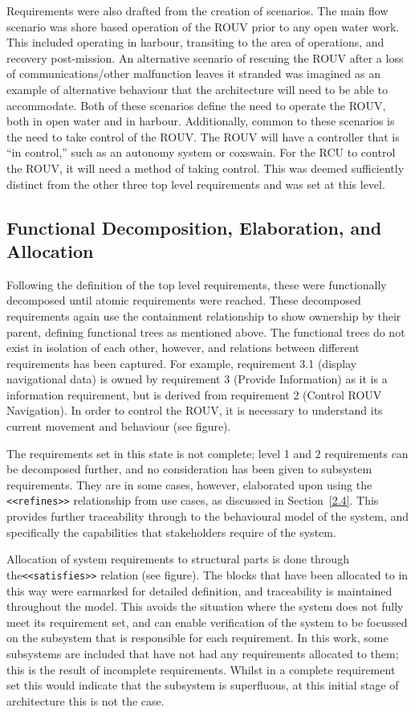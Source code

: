 \documentclass[../main.tex]{subfiles}
\begin{document}
Requirements were also drafted from the creation of scenarios.
The main flow scenario was shore based operation of the ROUV prior to any open water work.
This included operating in harbour, transiting to the area of operations, and recovery post-mission.
An alternative scenario of rescuing the ROUV after a loss of communications/other malfunction leaves it stranded was imagined as an example of alternative behaviour that the architecture will need to be able to accommodate.
Both of these scenarios define the need to operate the ROUV, both in open water and in harbour.
Additionally, common to these scenarios is the need to take control of the ROUV\@.
The ROUV will have a controller that is ``in control,'' such as an autonomy system or coxswain.
For the RCU to control the ROUV, it will need a method of taking control.
This was deemed sufficiently distinct from the other three top level requirements and was set at this level.

\subsection{Functional Decomposition, Elaboration, and Allocation}\label{2.2}

Following the definition of the top level requirements, these were functionally decomposed until atomic requirements were reached.
These decomposed requirements again use the containment relationship to show ownership by their parent, defining functional trees as mentioned above.
The functional trees do not exist in isolation of each other, however, and relations between different requirements has been captured.
For example, requirement 3.1 (display navigational data) is owned by requirement 3 (Provide Information) as it is a information requirement, but is derived from requirement 2 (Control ROUV Navigation).
In order to control the ROUV, it is necessary to understand its current movement and behaviour (see figure).

The requirements set in this state is not complete; level 1 and 2 requirements can be decomposed further, and no consideration has been given to subsystem requirements.
They are in some cases, however, elaborated upon using the \texttt{<<refines>>} relationship from use cases, as discussed in Section~\ref{2.4}. 
This provides further traceability through to the behavioural model of the system, and specifically the capabilities that stakeholders require of the system.

Allocation of system requirements to structural parts is done through the\texttt{<<satisfies>>} relation (see figure).
The blocks that have been allocated to in this way were earmarked for detailed definition, and traceability is maintained throughout the model.
This avoids the situation where the system does not fully meet its requirement set, and can enable verification of the system to be focussed on the subsystem that is responsible for each requirement.
In this work, some subsystems are included that have not had any requirements allocated to them; this is the result of incomplete requirements.
Whilst in a complete requirement set this would indicate that the subsystem is superfluous, at this initial stage of architecture this is not the case.
\end{document}
